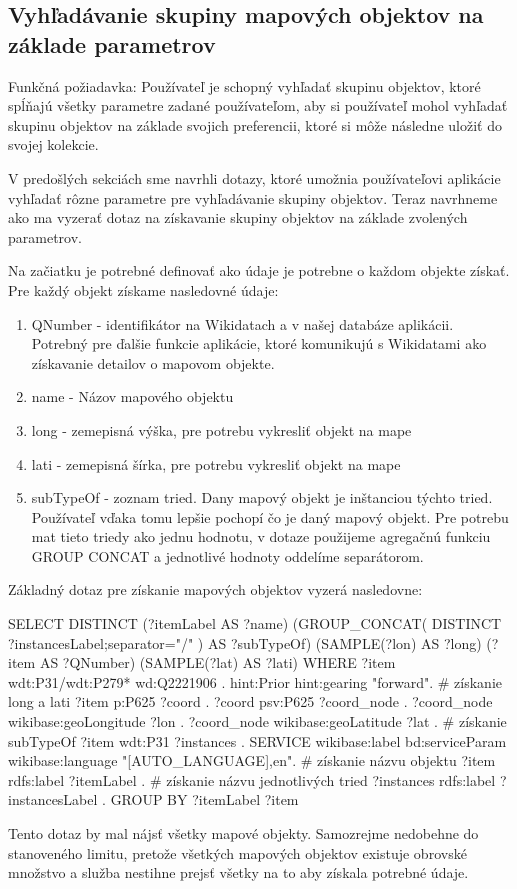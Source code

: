 \subsection{Vyhľadávanie skupiny mapových objektov na základe parametrov}
Funkčná požiadavka: Používateľ je schopný vyhľadať skupinu objektov, ktoré spĺňajú všetky parametre zadané používateľom, aby si používateľ mohol vyhľadať  skupinu objektov na základe
svojich preferencii, ktoré si môže následne uložiť do svojej kolekcie.

V predošlých sekciách sme navrhli dotazy, ktoré umožnia používateľovi aplikácie vyhľadať rôzne parametre pre vyhľadávanie skupiny objektov.
Teraz navrhneme ako ma vyzerať dotaz na získavanie skupiny objektov na základe zvolených parametrov.

Na začiatku je potrebné definovať ako údaje je potrebne o každom objekte získať.
Pre každý objekt získame nasledovné údaje:
\begin{enumerate}
      \item QNumber -  identifikátor na Wikidatach a v našej databáze aplikácii. Potrebný pre ďalšie funkcie aplikácie, ktoré komunikujú s Wikidatami ako získavanie detailov o mapovom objekte.
      \item name - Názov mapového objektu
      \item long - zemepisná výška, pre potrebu vykresliť objekt na mape
      \item lati - zemepisná šírka, pre potrebu vykresliť objekt na mape
      \item subTypeOf - zoznam tried. Dany mapový objekt je inštanciou týchto tried. Používateľ vďaka tomu lepšie pochopí čo je daný mapový objekt.
            Pre potrebu mat tieto triedy ako jednu hodnotu, v dotaze použijeme agregačnú funkciu GROUP CONCAT a jednotlivé hodnoty oddelíme separátorom.
\end{enumerate}

Základný dotaz pre získanie mapových objektov vyzerá nasledovne:
\begin{code}
      SELECT DISTINCT (?itemLabel AS ?name)
      (GROUP_CONCAT(
      DISTINCT ?instancesLabel;separator="/"
      ) AS ?subTypeOf)
      (SAMPLE(?lon) AS ?long)
      (?item AS ?QNumber)
      (SAMPLE(?lat) AS ?lati)
      WHERE {
      ?item wdt:P31/wdt:P279* wd:Q2221906 .
      hint:Prior hint:gearing "forward".
      # získanie long a lati
      ?item p:P625 ?coord .
      ?coord psv:P625 ?coord_node .
      ?coord_node wikibase:geoLongitude ?lon .
      ?coord_node wikibase:geoLatitude ?lat .
      # získanie subTypeOf
      ?item wdt:P31 ?instances .
      SERVICE wikibase:label {
      bd:serviceParam wikibase:language "[AUTO_LANGUAGE],en".
      # získanie názvu objektu
      ?item rdfs:label ?itemLabel .
      # získanie názvu jednotlivých tried
      ?instances rdfs:label ?instancesLabel . }
      } GROUP BY ?itemLabel ?item
\end{code}
Tento dotaz by mal nájsť všetky mapové objekty. 
Samozrejme nedobehne do stanoveného limitu, pretože všetkých mapových objektov existuje obrovské množstvo a služba nestihne prejsť všetky na to aby získala potrebné údaje. 

